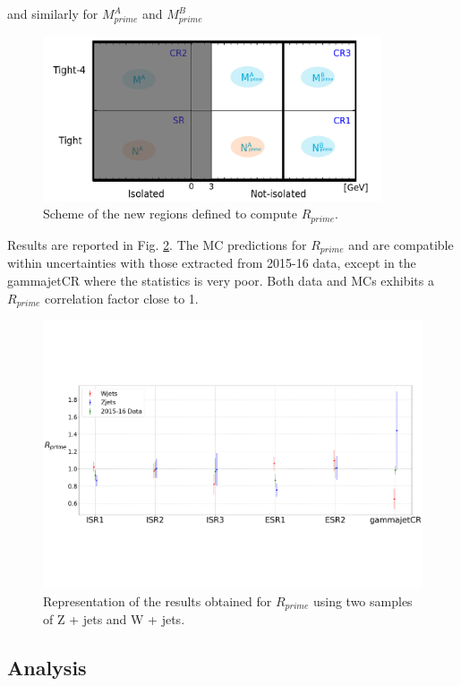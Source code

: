 \documentclass[11pt,a4paper,twoside,openright]{book}
\begin{document}
and similarly for $M^{A}_{prime}$ and $M^{B}_{prime}$

\begin{figure}[hbtp!]
    \centering
    \includegraphics[width=10cm]{ABCD_prime.jpg}
    \caption{Scheme of the new regions defined to compute $R_{prime}$.}
    \label{fig:ABCD_prime}
\end{figure}


Results are reported in Fig. \ref{fig:R_prime}. The MC predictions for $R_{prime}$ and are compatible within uncertainties with those extracted from 2015-16 data, except in the gammajetCR where the statistics is very poor. Both data and MCs exhibits a $R_{prime}$ correlation factor close to 1.

\begin{figure}[hbtp!]
    \centering
    \includegraphics[width=12cm]{R_prime.pdf}
    \caption{Representation of the results obtained for $R_{prime}$ using two samples of Z + jets and W + jets.}
    \label{fig:R_prime}
\end{figure}


\subsection{Analysis} \label{coefficients_analysis}
\end{document}
